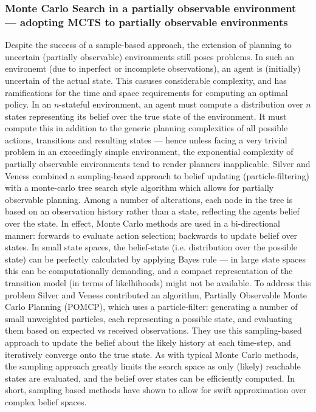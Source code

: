 \subsubsection{Monte Carlo Search in a partially observable environment --- adopting MCTS to partially observable environments}
Despite the success of a sample-based approach, the extension of planning to uncertain (partially observable) environments still poses problems. 
In such an environemt (due to inperfect or incomplete observations), an agent is (initially) uncertain of the actual state. This casuses considerable complexity, and has ramifications for the time and space requirements for computing an optimal policy.
In an $n$-stateful environment, an agent must compute a distribution over $n$ states representing its belief over the true state of the environment. 
It must compute this in addition to the generic planning complexities of all possible actions, transitions and resulting states --- hence unless facing a very trivial problem in an exceedingly simple environment, the exponential complexity of partially observable environments tend to render planners inapplicable. 
\newline \newline
Silver and Veness  \cite{Silver2010} combined a sampling-based approach to belief updating (particle-filtering) with a monte-carlo tree search style algorithm which allows for partially observable planning. Among a number of alterations, each node in the tree is based on an observation history rather than a state, reflecting the agents belief over the state. In effect, Monte Carlo methods are used in a bi-directional manner: forwards to evaluate action selection; backwards to update belief over states. 
\newline \newline
In small state spaces, the belief-state (i.e. distribution over the possible state) can be perfectly calculated by applying Bayes rule --- in large state spaces this can be computationally demanding, and a compact representation of the transition model (in terms of likelhihoods) might not be available. To address this problem Silver and Veness contributed an algorithm, Partially Observable Monte Carlo Planning (POMCP), which uses a particle-filter: generating a number of small unweighted particles, each representing a possible state, and evaluating them based on expected vs received observations. They use this sampling-based approach to update the belief about the likely history at each time-step, and iteratively converge onto the true state.
\newline \newline
As with typical Monte Carlo methods, the sampling approach greatly limits the search space as only (likely) reachable states are evaluated, and the belief over states can be efficiently computed. In short, sampling based methods have shown to allow for swift approximation over complex belief spaces.

